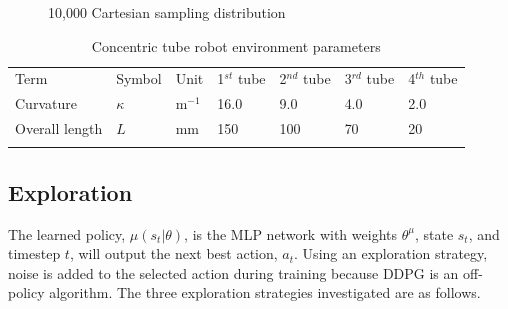 \begin{figure}
    \caption{10,000 Cartesian sampling distribution}
    \label{fig:cartesian-sampling}%
\end{figure}

\begin{table}
\centering
\begin{tabular}{lllllll}
\hline\noalign{\smallskip}
Term & Symbol & Unit & 1$^{st}$ tube & 2$^{nd}$ tube & 3$^{rd}$ tube & 4$^{th}$ tube\\
\noalign{\smallskip}\hline\noalign{\smallskip}
Curvature & $\kappa$ & m$^{-1}$ & 16.0 & 9.0 & 4.0 & 2.0\\
Overall length & $L$ & mm & 150 & 100 & 70 & 20\\
\noalign{\smallskip}\hline
\end{tabular}
\caption{Concentric tube robot environment parameters}
\label{tab:tube-env-params}
\end{table}

\subsection{Exploration}
The learned policy, $\mu(s_t | \theta)$, is the MLP network with weights $\theta^\mu$, state $s_t$, and timestep $t$, will output the next best action, $a_t$. Using an exploration strategy, noise is added to the selected action during training because DDPG is an off-policy algorithm. The three exploration strategies investigated are as follows.

